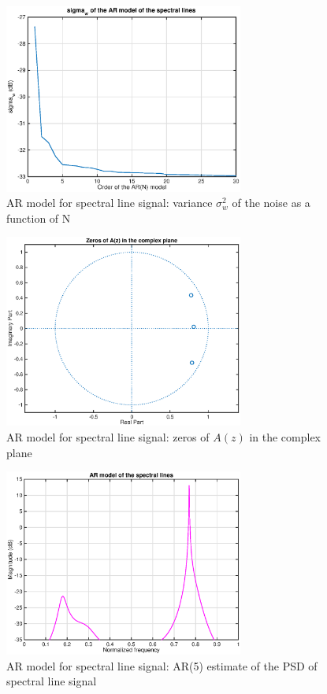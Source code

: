 \documentclass[10pt]{article}
\numberwithin{equation}{section}
\begin{document}
\begin{figure}[h!]
  \centering
  \includegraphics[width = 0.7\textwidth]{images/ar_lines_sigma}
  \caption{AR model for spectral line signal: variance $\sigma_w^2$ of the noise as a function of N}
  \label{fig:ar_lines_sigma}
\end{figure}

\begin{figure}[h!]
  \centering
  \includegraphics[width = 0.7\textwidth]{images/ar_lines_zeros}
  \caption{AR model for spectral line signal: zeros of $A(z)$ in the complex plane}
  \label{fig:zpl_lines}
\end{figure}

\begin{figure}[h!]
  \centering
  \includegraphics[width = 0.7\textwidth]{images/ar_lines_psd} 
  \caption{AR model for spectral line signal: AR(5) estimate of the PSD of spectral line signal}
  \label{fig:psd_lines}
\end{figure}
\end{document}

